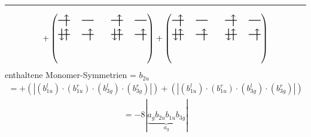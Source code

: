 \documentclass{article}
\begin{document}
\hrule\newpage 
\[ +\left(\text{\begin{tikzpicture}
    \draw[thick] (0,0) -- (0.5,0); %
    \draw[thick] (1,0) -- (1.5,0); %
    \draw[thick] (0,-0.6) -- (0.5,-0.6); %
    \draw[thick] (1,-0.6) -- (1.5,-0.6); %
\draw[->, thick] (0.35, -0.25) -- (0.35, 0.25); 
\draw[-> , thick] (0.35, -0.85) -- (0.35, -0.35); 
\draw[<- , thick] (0.15, -0.85) -- (0.15, -0.35); 
 \draw[-> , thick] (1.35, -0.85) -- (1.35, -0.35); 
\end{tikzpicture}\qquad \begin{tikzpicture}
    \draw[thick] (0,0) -- (0.5,0); %
    \draw[thick] (1,0) -- (1.5,0); %
    \draw[thick] (0,-0.6) -- (0.5,-0.6); %
    \draw[thick] (1,-0.6) -- (1.5,-0.6); %
\draw[->, thick] (0.35, -0.25) -- (0.35, 0.25); 
\draw[-> , thick] (0.35, -0.85) -- (0.35, -0.35); 
\draw[<- , thick] (0.15, -0.85) -- (0.15, -0.35); 
 \draw[-> , thick] (1.35, -0.85) -- (1.35, -0.35); 
\end{tikzpicture}}\right)+\left(\text{\begin{tikzpicture}
    \draw[thick] (0,0) -- (0.5,0); %
    \draw[thick] (1,0) -- (1.5,0); %
    \draw[thick] (0,-0.6) -- (0.5,-0.6); %
    \draw[thick] (1,-0.6) -- (1.5,-0.6); %
\draw[->, thick] (0.35, -0.25) -- (0.35, 0.25); 
\draw[-> , thick] (0.35, -0.85) -- (0.35, -0.35); 
\draw[<- , thick] (0.15, -0.85) -- (0.15, -0.35); 
 \draw[-> , thick] (1.35, -0.85) -- (1.35, -0.35); 
\end{tikzpicture}\qquad \begin{tikzpicture}
    \draw[thick] (0,0) -- (0.5,0); %
    \draw[thick] (1,0) -- (1.5,0); %
    \draw[thick] (0,-0.6) -- (0.5,-0.6); %
    \draw[thick] (1,-0.6) -- (1.5,-0.6); %
\draw[->, thick] (0.35, -0.25) -- (0.35, 0.25); 
\draw[-> , thick] (0.35, -0.85) -- (0.35, -0.35); 
\draw[<- , thick] (0.15, -0.85) -- (0.15, -0.35); 
 \draw[-> , thick] (1.35, -0.85) -- (1.35, -0.35); 
\end{tikzpicture}}\right)\]enthaltene Monomer-Symmetrien = $b_{2u}$\begin{multline*}=+\left(\left|(b_{1u}^{l}) \cdot (b_{1u}^{r}) \cdot (b_{3g}^{l}) \cdot (b_{3g}^{r})\right|\right)+\left(\left|(b_{1u}^{l}) \cdot (b_{1u}^{r}) \cdot (b_{3g}^{l}) \cdot (b_{3g}^{r})\right|\right)\end{multline*}
\begin{multline*}
=-8\left|\underbrace{a_{g} b_{2u} b_{1u} b_{3g}}_{a_{g}}\right|
\end{multline*}
\\\\
\end{document}
